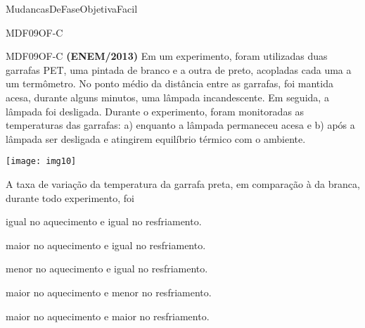 \documentclass[12pt]{article}
\begin{document}
\begin{quiz}{MudancasDeFaseObjetivaFacil}
\begin{multi}[points=1]{MDF09OF-C}
		\end{multi}
		\begin{multi}[points=1]{MDF09OF-C}
			\textbf{(ENEM/2013)} Em um experimento, foram utilizadas duas garrafas PET, uma pintada de branco e a outra de preto, acopladas cada uma a um termômetro. No ponto médio da distância entre as garrafas, foi mantida acesa, durante alguns minutos, uma lâmpada incandescente. Em seguida, a lâmpada foi desligada. Durante o experimento, foram monitoradas as temperaturas das garrafas: a) enquanto a lâmpada permaneceu acesa e b) após a lâmpada ser desligada e atingirem equilíbrio térmico com o ambiente.
			\begin{center}
				\texttt{[image: img10]}		
			\end{center}		
			A taxa de variação da temperatura da garrafa preta, em comparação à da branca, durante todo experimento, foi											
			\item igual no aquecimento e igual no resfriamento.
			\item maior no aquecimento e igual no resfriamento.
			\item menor no aquecimento e igual no resfriamento.
			\item maior no aquecimento e menor no resfriamento.
			\item* maior no aquecimento e maior no resfriamento.
		\end{multi}										
	\end{quiz}
\end{document}
